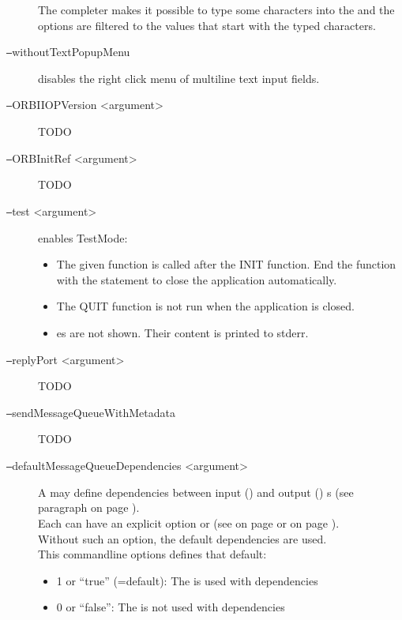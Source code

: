\begin{description}
  The completer makes it possible to type some characters into the \COMBOBOX{} and the options
  are filtered to the values that start with the typed characters.
%
\item[\texttt{--}withoutTextPopupMenu] disables the right click menu of multiline text input fields.
%
\item[\texttt{--}ORBIIOPVersion <argument>]
  TODO
%
\item[\texttt{--}ORBInitRef <argument>]
  TODO
%
\item[\texttt{--}test <argument>] enables TestMode:
  \begin{itemize}
  \item The given function is called after the INIT function.
        End the function with the \EXIT{} statement to close the application automatically.
  \item The QUIT function is not run when the application is closed.
  \item \MESSAGEBOX{}es are not shown. Their content is printed to stderr.
  \end{itemize}
%
\item[\texttt{--}replyPort <argument>]
  TODO
%
\item[\texttt{--}sendMessageQueueWithMetadata]
  TODO
%
\item[\texttt{--}defaultMessageQueueDependencies <argument>]
  A \MESSAGEQUEUE{} \REQUEST{} may define dependencies between input (\REQUEST) and output (\RESPONSE) \STREAM{}s
  (see paragraph  on page \pageref{par:stdependency}). \\
  Each \STREAM{} can have an explicit option \DEPENDENCIES{} or \NODEPENDENCIES{}
  (see  on page \pageref{dia:jobmessagequeueoption} or
   on page \pageref{dia:jobpluginoption}). \\
  Without such an option, the default \MESSAGEQUEUE{} dependencies are used. \\
  This commandline options defines that default:
  \begin{itemize}
  \item 1 or ``true'' (=default): The \STREAM{} is used with dependencies
  \item 0 or ``false'': The \STREAM{} is not used with dependencies
  \end{itemize}
\end{description}
